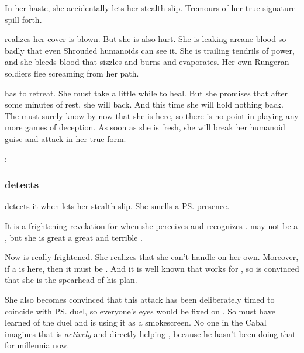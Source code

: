 In her haste, she accidentally lets her stealth slip.
Tremours of her true \vertex signature spill forth. 

\Takestsha realizes her cover is blown. 
But she is also hurt. 
She is leaking arcane blood so badly that even Shrouded humanoids can see it.
She is trailing tendrils of power, and she bleeds blood that sizzles and burns and evaporates. 
Her own Rungeran soldiers flee screaming from her path.

\Takestsha has to retreat. 
She must take a little while to heal. 
But she promises that after some minutes of rest, she will back.
And this time she will hold nothing back.
The \resphain must surely know by now that she is here, so there is no point in playing any more games of deception.
As soon as she is fresh, she will break her humanoid guise and attack in her true form. 

\begin{prose}
  \Takestsha: 
\end{prose}






\subsubsection{\Achsah detects \Nzessuacrith}
\Achsah detects it when \Nzessuacrith lets her stealth slip. 
She smells a \ps{\dragon}{} presence. 

It is a frightening  revelation for \Achsah when she perceives and recognizes \Nzessuacrith.
\Nzessuacrith may not be a \shaeeroth, but she is great a great and terrible \dragon. 

Now \Achsah{} is really frightened. 
She realizes that she can't handle \Nzessuacrith{} on her own. 
Moreover, if a \dragon{} is here, then it must be . 
And it is well known that \Nzessuacrith{} works for \Secherdamon, so \Achsah{} is convinced that she is the spearhead of his plan. 

She also becomes convinced that this attack has been deliberately timed to coincide with \ps{\Teshrial} duel, so everyone's eyes would be fixed on \Malcur. 
So \Secherdamon{} must have learned of the duel and is using it as a smokescreen. 
No one in the Cabal imagines that \Ishnaruchaefir{} is \emph{actively} and directly helping \Secherdamon, because he hasn't been doing that for millennia now. 






